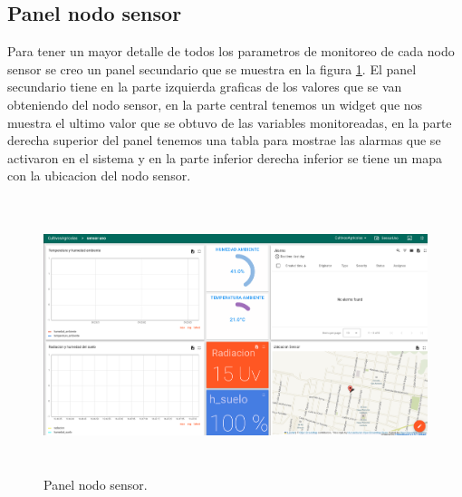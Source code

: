 \clearpage
\subsection{Panel nodo sensor} 

Para tener un mayor detalle de todos los parametros de monitoreo de cada nodo sensor se creo un panel secundario que se muestra en la figura \ref{fig:Panel nodo sensor}.
El panel secundario tiene en la parte izquierda graficas de los valores que se van obteniendo del nodo sensor, en la parte central tenemos un widget que nos muestra el ultimo valor que se obtuvo de las variables monitoreadas, en la parte derecha superior del panel tenemos una tabla para mostrae las alarmas que se activaron en el sistema y en la parte inferior derecha inferior se tiene un mapa con la ubicacion del nodo sensor.  

\begin{figure}[h!]
  \centering
	\includegraphics[width=\textwidth, height=8cm]{./Figures/panel_nodosensor.png}
  \caption{Panel nodo sensor.}
	\label{fig:Panel nodo sensor}
\end{figure}